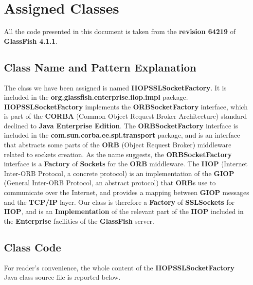\section{Assigned Classes}
All the code presented in this document is taken from the \textbf{revision 64219} of \textbf{GlassFish 4.1.1}.
%
\subsection{Class Name and Pattern Explanation}
The class we have been assigned is named \textbf{IIOPSSLSocketFactory}.
It is included in the \textbf{org.glassfish.enterprise.iiop.impl} package.
\textbf{IIOPSSLSocketFactory} implements the \textbf{ORBSocketFactory} interface, which is part of the \textbf{CORBA} (Common Object Request Broker Architecture) standard declined to \textbf{Java Enterprise Edition}.
The \textbf{ORBSocketFactory} interface is included in the \textbf{com.sun.corba.ee.spi.transport} package, and is an interface that abstracts some parts of the \textbf{ORB} (Object Request Broker) middleware related to sockets creation.
As the name suggests, the \textbf{ORBSocketFactory} interface is a \textbf{Factory} of \textbf{Sockets} for the \textbf{ORB} middleware.
The \textbf{IIOP} (Internet Inter-ORB Protocol, a concrete protocol) is an implementation of the \textbf{GIOP} (General Inter-ORB Protocol, an abstract protocol) that \textbf{ORB}s use to communicate over the Internet, and provides a mapping between \textbf{GIOP} messages and the \textbf{TCP/IP} layer.
Our class is therefore a \textbf{Factory} of \textbf{SSLSockets} for \textbf{IIOP}, and is an \textbf{Implementation} of the relevant part of the \textbf{IIOP} included in the \textbf{Enterprise} facilities of the \textbf{GlassFish} server.
%
\subsection{Class Code}
For reader's convenience, the whole content of the \textbf{IIOPSSLSocketFactory} Java class source file is reported below.
